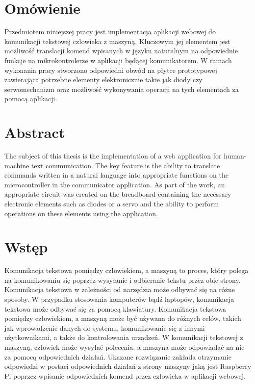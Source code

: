 \section{Omówienie}
Przedmiotem niniejszej pracy jest implementacja aplikacji webowej do komunikacji tekstowej człowieka z maszyną. Kluczowym jej elementem jest możliwość translacji komend wpisanych w języku naturalnym na odpowiednie funkcje na mikrokontrolerze w aplikacji będącej komunikatorem. W ramach wykonania pracy stworzono odpowiedni obwód na płytce prototypowej zawierająca potrzebne elementy elektronicznie takie jak diody czy serwomechanizm oraz możliwość wykonywania operacji na tych elementach za pomocą aplikacji.
\section{Abstract}
The subject of this thesis is the implementation of a web application for human-machine text communication. The key feature is the ability to translate commands written in a natural language into appropriate functions on the microcontroller in the communicator application. As part of the work, an appropriate circuit was created on the breadboard containing the necessary electronic elements such as diodes or a servo and the ability to perform operations on these elements using the application.
\section{Wstęp}
Komunikacja tekstowa pomiędzy człowiekiem, a maszyną to proces, który polega na komunikowaniu się poprzez wysyłanie i odbieranie tekstu przez obie strony. Komunikacja tekstowa w zależności od narzędzia może odbywać się na różne sposoby. W przypadku stosowania komputerów bądź laptopów, komunikacja tekstowa może odbywać się za pomocą klawiatury. Komunikacja tekstowa pomiędzy człowiekiem, a maszyną może być używana do różnych celów, takich jak wprowadzenie danych do systemu, komunikowanie się z innymi użytkownikami, a także do kontrolowania urządzeń. W komunikacji tekstowej z maszyną, człowiek może wysyłać polecenia, a maszyna może odpowiadać na nie za pomocą odpowiednich działań. Ukazane rozwiązanie zakłada otrzymanie odpowiedzi w postaci odpowiednich działań z strony maszyny jaką jest Raspberry Pi poprzez wpisanie odpowiednich komend przez człowieka w aplikacji webowej.

